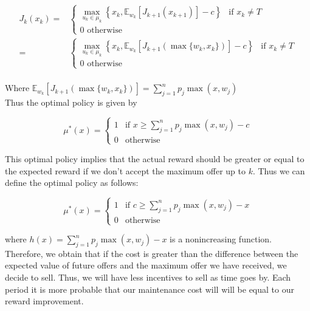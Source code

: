 \documentclass[11pt, english]{article}
\newcommand{\su}[2]{\sum\limits_{#1}^{#2}}
\begin{document}
\begin{align*}
J_k(x_k) =& \left\{\begin{array}{ll}
\max\limits_{u_k \in \mu_k} \left\{x_k, \mathbb{E}_{w_k} \left[J_{k+1} (x_{k+1})\right] - c \right\} & \text{if } x_k \neq T\\
0 \text{ otherwise} & 
\end{array}\right.  \\
= & \left\{\begin{array}{ll}
\max\limits_{u_k \in \mu_k} \left\{x_k, \mathbb{E}_{w_k} \left[J_{k+1} (\max\{w_k, x_k\})\right] - c \right\} & \text{if } x_k \neq T\\
0 \text{ otherwise} & 
\end{array}\right.
\end{align*}\\

Where $\mathbb{E}_{w_k} \left[J_{k+1} (\max\{w_k, x_k\})\right] = \su{j = 1}{n} p_j\max (x, w_j)$ \\

Thus the optimal policy is given by

\begin{equation*}
\mu^*(x) = \left\{\begin{array}{ll}
1 & \text{if } x \geq  \su{j = 1}{n} p_j\max (x, w_j) - c\\
0 & \text{otherwise}
\end{array}\right.
\end{equation*}

This optimal policy implies that the actual reward should be greater or equal to the expected reward if we don't accept the maximum offer up to $k$. Thus we can define the optimal policy as follows:

\begin{equation*}
\mu^*(x) = \left\{\begin{array}{ll}
1 & \text{if } c \geq  \su{j = 1}{n} p_j\max (x, w_j) - x\\
0 & \text{otherwise}
\end{array}\right.
\end{equation*}

where $h(x) = \su{j = 1}{n} p_j\max (x, w_j) - x$ is a nonincreasing function. Therefore, we obtain that if the cost is greater than the difference between the expected value of future offers and the maximum offer we have received, we decide to sell. Thus, we will have less incentives to sell as time goes by. Each period it is more probable that our maintenance cost will will be equal to our reward improvement.\\
\end{document}
